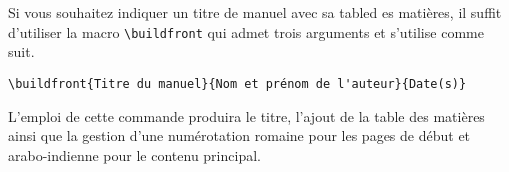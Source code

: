 Si vous souhaitez indiquer un titre de manuel avec sa tabled es matières, il suffit d'utiliser la macro \verb+\buildfront+ qui admet trois arguments et s'utilise comme suit.
\begin{verbatim}
\buildfront{Titre du manuel}{Nom et prénom de l'auteur}{Date(s)}
\end{verbatim}


L'emploi de cette commande produira le titre, l'ajout de la table des matières ainsi que la gestion d'une numérotation romaine pour les pages de début et arabo-indienne pour le contenu principal.
